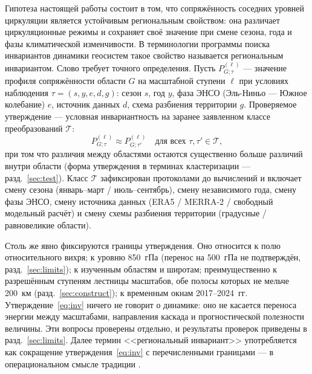 \documentclass[11pt,a4paper]{article}
\begin{document}
Гипотеза настоящей работы состоит в том, что сопряжённость соседних уровней циркуляции является устойчивым региональным свойством: она различает циркуляционные режимы и сохраняет своё значение при смене сезона, года и фазы климатической изменчивости. В терминологии программы поиска инвариантов динамики геосистем \cite{Puzachenko2010} такое свойство называется региональным инвариантом. Слово требует точного определения. Пусть $P^{(\ell)}_{G;\tau}$ --- значение профиля сопряжённости области $G$ на масштабной ступени $\ell$ при условиях наблюдения $\tau=(s,y,e,d,g)$: сезон $s$, год $y$, фаза ЭНСО (Эль-Ниньо --- Южное колебание) $e$, источник данных $d$, схема разбиения территории $g$. Проверяемое утверждение --- условная инвариантность на заранее заявленном классе преобразований $\mathcal{T}$:
\begin{equation}
\label{eq:inv}
P^{(\ell)}_{G;\tau}\approx P^{(\ell)}_{G;\tau'}\quad\text{для всех }\tau,\tau'\in\mathcal{T},
\end{equation}
при том что различия между областями остаются существенно больше различий внутри области (форма утверждения в терминах кластеризации --- разд.~\ref{sec:test}). Класс $\mathcal{T}$ зафиксирован протоколами до вычислений и включает смену сезона (январь--март / июль--сентябрь), смену независимого года, смену фазы ЭНСО, смену источника данных (ERA5 / MERRA-2 / свободный модельный расчёт) и смену схемы разбиения территории (градусные / равновеликие области).

Столь же явно фиксируются границы утверждения. Оно относится к полю относительного вихря; к уровню 850~гПа (перенос на 500~гПа не подтверждён, разд.~\ref{sec:limits}); к изученным областям и широтам; преимущественно к разрешённым ступеням лестницы масштабов, обе полосы которых не мельче 200~км (разд.~\ref{sec:construct}); к временным окнам 2017--2024~гг. Утверждение~\eqref{eq:inv} ничего не говорит о динамике: оно не касается переноса энергии между масштабами, направления каскада и прогностической полезности величины. Эти вопросы проверены отдельно, и результаты проверок приведены в разд.~\ref{sec:limits}. Далее термин <<региональный инвариант>> употребляется как сокращение утверждения~\eqref{eq:inv} с перечисленными границами --- в операциональном смысле традиции \cite{Puzachenko2010}.
\end{document}
